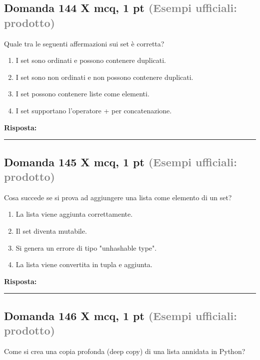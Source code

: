 \documentclass[a4paper,11pt]{article}
\begin{document}
\subsection*{Domanda 144 X \hfill {\small mcq, 1 pt \textcolor{gray}{(Esempi ufficiali: prodotto)}}}
Quale tra le seguenti affermazioni sui set è corretta?

\begin{enumerate}[label=\alph*)]
\item I set sono ordinati e possono contenere duplicati.
\item I set sono non ordinati e non possono contenere duplicati.
\item I set possono contenere liste come elementi.
\item I set supportano l'operatore + per concatenazione.
\end{enumerate}
\vspace{0.2cm}
\noindent\textbf{Risposta:}\par
\vspace{1.5cm}\hrule


\subsection*{Domanda 145 X \hfill {\small mcq, 1 pt \textcolor{gray}{(Esempi ufficiali: prodotto)}}}
Cosa succede se si prova ad aggiungere una lista come elemento di un set?

\begin{enumerate}[label=\alph*)]
\item La lista viene aggiunta correttamente.
\item Il set diventa mutabile.
\item Si genera un errore di tipo "unhashable type".
\item La lista viene convertita in tupla e aggiunta.
\end{enumerate}
\vspace{0.2cm}
\noindent\textbf{Risposta:}\par
\vspace{1.5cm}\hrule


\subsection*{Domanda 146 X \hfill {\small mcq, 1 pt \textcolor{gray}{(Esempi ufficiali: prodotto)}}}
Come si crea una copia profonda (deep copy) di una lista annidata in Python?
\end{document}
